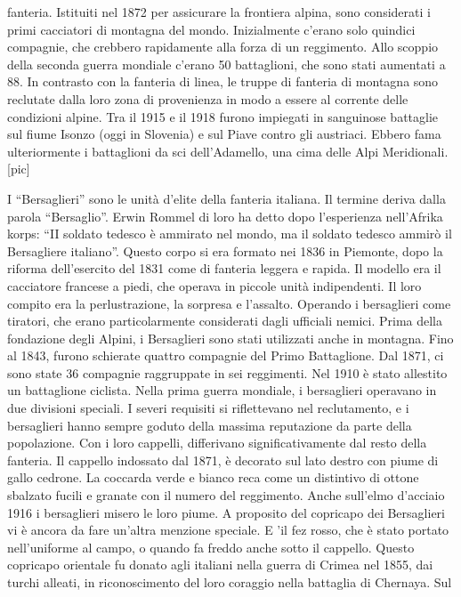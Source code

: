 fanteria. Istituiti nel 1872 per assicurare la frontiera alpina, sono
considerati i primi cacciatori di montagna del mondo. Inizialmente
c'erano solo quindici compagnie, che crebbero rapidamente alla forza di
un reggimento. Allo scoppio della seconda guerra mondiale c'erano 50
battaglioni, che sono stati aumentati a 88. In contrasto con la fanteria
di linea, le truppe di fanteria di montagna sono reclutate dalla loro
zona di provenienza in modo a essere al corrente delle condizioni
alpine. Tra il 1915 e il 1918 furono impiegati in sanguinose battaglie
sul fiume Isonzo (oggi in Slovenia) e sul Piave contro gli austriaci.
Ebbero fama ulteriormente i battaglioni da sci dell'Adamello, una cima
delle Alpi Meridionali. {[}pic{]}

I ``Bersaglieri'' sono le unità d'elite della fanteria italiana. Il
termine deriva dalla parola ``Bersaglio''. Erwin Rommel di loro ha detto
dopo l'esperienza nell'Afrika korps: ``II soldato tedesco è ammirato nel
mondo, ma il soldato tedesco ammirò il Bersagliere italiano''. Questo
corpo si era formato nei 1836 in Piemonte, dopo la riforma dell'esercito
del 1831 come di fanteria leggera e rapida. Il modello era il cacciatore
francese a piedi, che operava in piccole unità indipendenti. Il loro
compito era la perlustrazione, la sorpresa e l'assalto. Operando i
bersaglieri come tiratori, che erano particolarmente considerati dagli
ufficiali nemici. Prima della fondazione degli Alpini, i Bersaglieri
sono stati utilizzati anche in montagna. Fino al 1843, furono schierate
quattro compagnie del Primo Battaglione. Dal 1871, ci sono state 36
compagnie raggruppate in sei reggimenti. Nel 1910 è stato allestito un
battaglione ciclista. Nella prima guerra mondiale, i bersaglieri
operavano in due divisioni speciali. I severi requisiti si riflettevano
nel reclutamento, e i bersaglieri hanno sempre goduto della massima
reputazione da parte della popolazione. Con i loro cappelli, differivano
significativamente dal resto della fanteria. Il cappello indossato dal
1871, è decorato sul lato destro con piume di gallo cedrone. La coccarda
verde e bianco reca come un distintivo di ottone sbalzato fucili e
granate con il numero del reggimento. Anche sull'elmo d'acciaio 1916 i
bersaglieri misero le loro piume. A proposito del copricapo dei
Bersaglieri vi è ancora da fare un'altra menzione speciale. E 'il fez
rosso, che è stato portato nell'uniforme al campo, o quando fa freddo
anche sotto il cappello. Questo copricapo orientale fu donato agli
italiani nella guerra di Crimea nel 1855, dai turchi alleati, in
riconoscimento del loro coraggio nella battaglia di Chernaya. Sul
